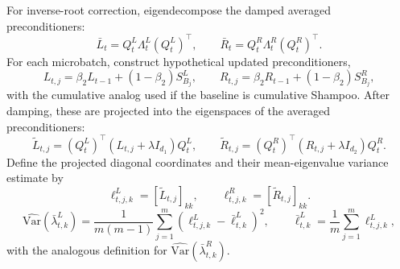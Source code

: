 \documentclass{article}
\newcommand{\Var}{\mathrm{Var}}
\begin{document}
For inverse-root correction, eigendecompose the damped averaged preconditioners:
\begin{equation}
    \bar L_t=Q_t^L\Lambda_t^L(Q_t^L)^\top,
    \qquad
    \bar R_t=Q_t^R\Lambda_t^R(Q_t^R)^\top.
\end{equation}
For each microbatch, construct hypothetical updated preconditioners,
\begin{equation}
    L_{t,j}=\beta_2L_{t-1}+(1-\beta_2)S_{B_j}^L,
    \qquad
    R_{t,j}=\beta_2R_{t-1}+(1-\beta_2)S_{B_j}^R,
\end{equation}
with the cumulative analog used if the baseline is cumulative Shampoo. After damping, these are projected into the eigenspaces of the averaged preconditioners:
\begin{equation}
    \widetilde L_{t,j}=(Q_t^L)^\top(L_{t,j}+\lambda I_{d_1})Q_t^L,
    \qquad
    \widetilde R_{t,j}=(Q_t^R)^\top(R_{t,j}+\lambda I_{d_2})Q_t^R.
\end{equation}
Define the projected diagonal coordinates and their mean-eigenvalue variance estimate by
\begin{equation}
    \ell^L_{t,j,k}=[\widetilde L_{t,j}]_{kk},
    \qquad
    \ell^R_{t,j,k}=[\widetilde R_{t,j}]_{kk}.
\end{equation}
\begin{equation}
    \widehat{\Var}(\bar\lambda^L_{t,k})
    =
    \frac{1}{m(m-1)}\sum_{j=1}^m(\ell^L_{t,j,k}-\bar\ell^L_{t,k})^2,
    \qquad
    \bar\ell^L_{t,k}=\frac{1}{m}\sum_{j=1}^m\ell^L_{t,j,k},
\end{equation}
with the analogous definition for $\widehat{\Var}(\bar\lambda^R_{t,k})$.
\end{document}
